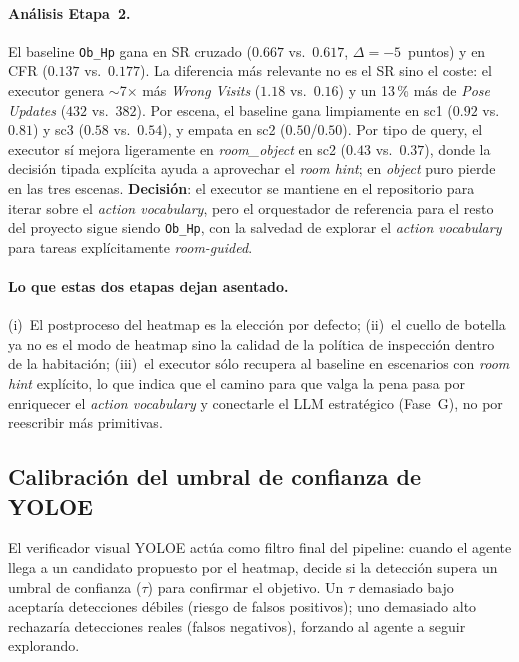 \documentclass[11pt,a4paper]{article}
\begin{document}
\paragraph{Análisis Etapa~2.} El baseline \texttt{Ob\_Hp} gana en SR cruzado
($0.667$ vs.\ $0.617$, $\Delta=-5$~puntos) y en CFR ($0.137$ vs.\ $0.177$). La
diferencia más relevante no es el SR sino el coste: el executor genera
$\sim$7$\times$ más \emph{Wrong Visits} ($1.18$ vs.\ $0.16$) y un 13\,\%
más de \emph{Pose Updates} ($432$ vs.\ $382$). Por escena, el baseline gana
limpiamente en sc1 ($0.92$ vs.\ $0.81$) y sc3 ($0.58$ vs.\ $0.54$), y empata
en sc2 ($0.50$/$0.50$). Por tipo de query, el executor sí mejora ligeramente
en \emph{room\_object} en sc2 ($0.43$ vs.\ $0.37$), donde la decisión tipada
explícita ayuda a aprovechar el \emph{room hint}; en \emph{object} puro
pierde en las tres escenas. \textbf{Decisión}: el executor se mantiene en el
repositorio para iterar sobre el \emph{action vocabulary}, pero el orquestador
de referencia para el resto del proyecto sigue siendo \texttt{Ob\_Hp}, con la
salvedad de explorar el \emph{action vocabulary} para tareas explícitamente
\emph{room-guided}.

\paragraph{Lo que estas dos etapas dejan asentado.}
(i)~El postproceso del heatmap es la elección por defecto; (ii)~el cuello de
botella ya no es el modo de heatmap sino la calidad de la política de
inspección dentro de la habitación; (iii)~el executor sólo recupera al
baseline en escenarios con \emph{room hint} explícito, lo que indica que el
camino para que valga la pena pasa por enriquecer el \emph{action vocabulary}
y conectarle el LLM estratégico (Fase~G), no por reescribir más primitivas.

\subsection*{Calibración del umbral de confianza de YOLOE}
\label{sec:yoloe-thresh}

El verificador visual YOLOE actúa como filtro final del pipeline: cuando el
agente llega a un candidato propuesto por el heatmap, decide si la detección
supera un umbral de confianza ($\tau$) para confirmar el objetivo. Un $\tau$
demasiado bajo aceptaría detecciones débiles (riesgo de falsos positivos);
uno demasiado alto rechazaría detecciones reales (falsos negativos), forzando
al agente a seguir explorando.
\end{document}

